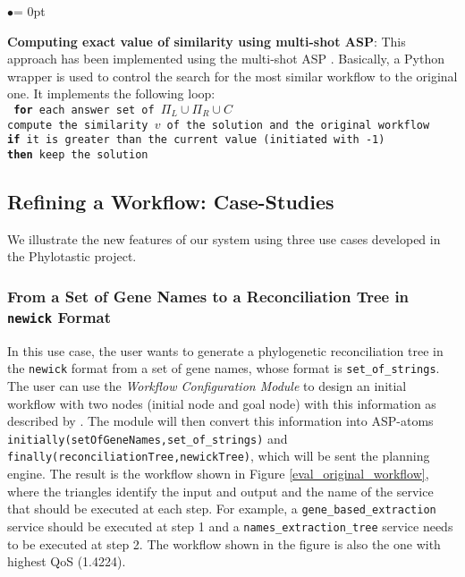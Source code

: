 \documentclass{new_tlp}
\begin{document}
\begin{list}{$\bullet$}{\itemsep = 0pt \parsep=1pt \topsep=1pt \leftmargin=10pt}
\item {\bf Computing exact value of similarity using multi-shot ASP}: 
This approach has been implemented using the multi-shot ASP \cite{KaminskiSW17}. Basically, a Python wrapper is used to control the search for the most similar workflow to the original one. It implements the following loop: \\
\texttt{\footnotesize
\hspace*{.25cm}  \textbf{for} each answer set of $\Pi_L \cup \Pi_R \cup C$ \\ 
\hspace*{.5cm} compute the similarity $v$ of the solution and the original workflow \\
\hspace*{.5cm}  \textbf{if} it is greater than the current value (initiated with -1) \\
\hspace*{.5cm} \textbf{then} keep the solution 
}




\end{list} 
%
\subsection{Refining a Workflow: Case-Studies}
%
We illustrate the new features of our system using three use cases developed in the Phylotastic project. 

\subsubsection{From a Set of Gene Names to a Reconciliation Tree in \texttt{\small newick} Format} 
In this use case, the user wants to generate a 
phylogenetic reconciliation tree in the \texttt{\small newick} format from a set of gene names, whose format is 
\texttt{\small set\_of\_strings}. %
The user can use the  {\em Workflow Configuration Module} to design an initial workflow with two nodes (initial node and goal node) 
with this information as described by . The module will then convert this information into ASP-atoms \texttt{\small initially(setOfGeneNames,set\_of\_strings)} and \texttt{\small finally(reconciliationTree,newickTree)}, which will be sent 
the planning engine.  
The result is the workflow shown in Figure \ref{eval_original_workflow}, where the triangles identify the input and output and the name of the service that should be executed at each step. For example, a \texttt{\small gene\_based\_extraction} service should be executed at step 1 and a \texttt{\small names\_extraction\_tree} service needs to be executed at step 2. The workflow shown in the figure is also the one with highest QoS (1.4224).
\end{document}
